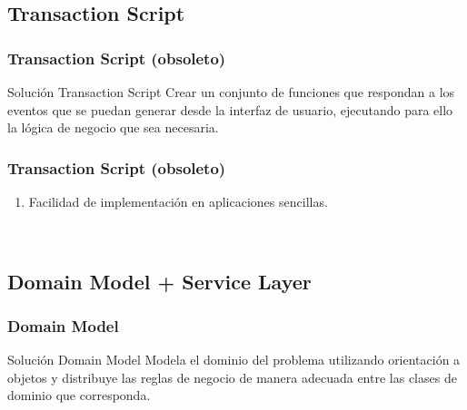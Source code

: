 \documentclass[a4paper,slidestop,xcolor=pst,dvips,blue]{beamer}
\begin{document}
\subsection{Transaction Script}

\begin{frame}[c]
    \frametitle{Transaction Script (obsoleto)}
    \begin{block}{Solución Transaction Script}
        Crear un conjunto de funciones que respondan a los eventos que se puedan generar
        desde la interfaz de usuario, ejecutando para ello la lógica de negocio que sea necesaria.
    \end{block}
\end{frame}

\begin{frame}[c]
    \frametitle{Transaction Script (obsoleto)}
    \begin{enumerate}
        \item<2-> Facilidad de implementación en aplicaciones sencillas.
    \end{enumerate}
    \ \\
\end{frame}

\subsection{Domain Model + Service Layer}

\begin{frame}[c]
    \frametitle{Domain Model}
    \begin{block}{Solución Domain Model}
        Modela el dominio del problema utilizando orientación a objetos y distribuye las reglas de negocio de manera adecuada entre las clases de dominio que corresponda.
    \end{block}
\end{frame}
\end{document}
